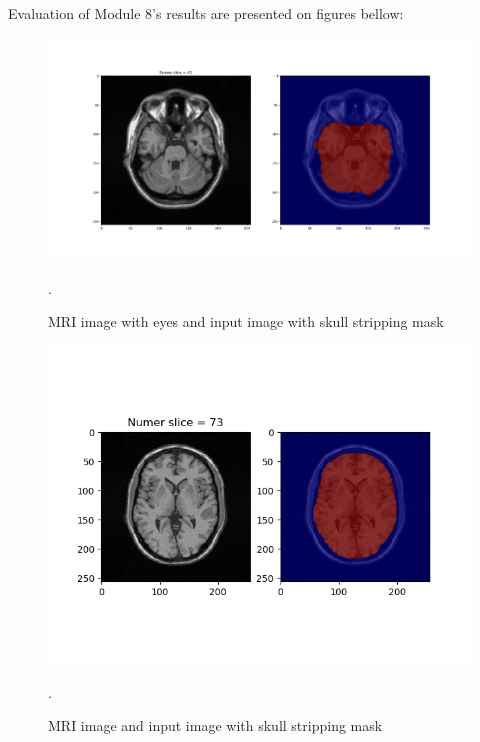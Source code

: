 Evaluation of Module 8's results are presented on figures bellow:
\begin{figure}[H]
\centering{}\includegraphics[scale=0.3]{documentation/figures/M8_Figure_1.png}\caption{MRI image with eyes and input image with skull stripping mask}.
\label{fig:figures/Module8_Figure_1}
\end{figure}
\begin{figure}[H]
\centering{}\includegraphics[scale=0.8]{documentation/figures/M8_Figure_1-3.png}\caption{MRI image and input image with skull stripping mask}.
\label{fig:figures/Module8_Figure_2}
\end{figure}
